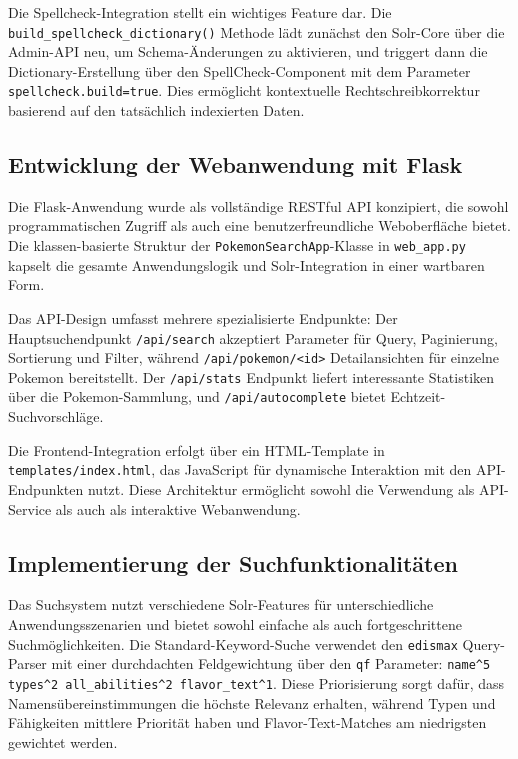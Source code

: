 Die Spellcheck-Integration stellt ein wichtiges Feature dar. Die \texttt{build\_spellcheck\_dictionary()} Methode lädt zunächst den Solr-Core über die Admin-API neu, um Schema-Änderungen zu aktivieren, und triggert dann die Dictionary-Erstellung über den SpellCheck-Component mit dem Parameter \texttt{spellcheck.build=true}. Dies ermöglicht kontextuelle Rechtschreibkorrektur basierend auf den tatsächlich indexierten Daten.

\subsection{Entwicklung der Webanwendung mit Flask}

Die Flask-Anwendung wurde als vollständige RESTful API konzipiert, die sowohl programmatischen Zugriff als auch eine benutzerfreundliche Weboberfläche bietet. Die klassen-basierte Struktur der \texttt{PokemonSearchApp}-Klasse in \texttt{web\_app.py} kapselt die gesamte Anwendungslogik und Solr-Integration in einer wartbaren Form.

Das API-Design umfasst mehrere spezialisierte Endpunkte: Der Hauptsuchendpunkt \texttt{/api/search} akzeptiert Parameter für Query, Paginierung, Sortierung und Filter, während \texttt{/api/pokemon/<id>} Detailansichten für einzelne Pokemon bereitstellt. Der \texttt{/api/stats} Endpunkt liefert interessante Statistiken über die Pokemon-Sammlung, und \texttt{/api/autocomplete} bietet Echtzeit-Suchvorschläge.

Die Frontend-Integration erfolgt über ein HTML-Template in \texttt{templates/index.html}, das JavaScript für dynamische Interaktion mit den API-Endpunkten nutzt. Diese Architektur ermöglicht sowohl die Verwendung als API-Service als auch als interaktive Webanwendung.

\subsection{Implementierung der Suchfunktionalitäten}

Das Suchsystem nutzt verschiedene Solr-Features für unterschiedliche Anwendungsszenarien und bietet sowohl einfache als auch fortgeschrittene Suchmöglichkeiten. Die Standard-Keyword-Suche verwendet den \texttt{edismax} Query-Parser mit einer durchdachten Feldgewichtung über den \texttt{qf} Parameter: \texttt{name\textasciicircum 5 types\textasciicircum 2 all\_abilities\textasciicircum 2 flavor\_text\textasciicircum 1}. Diese Priorisierung sorgt dafür, dass Namensübereinstimmungen die höchste Relevanz erhalten, während Typen und Fähigkeiten mittlere Priorität haben und Flavor-Text-Matches am niedrigsten gewichtet werden.

